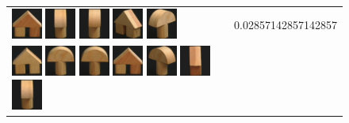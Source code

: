 \begin{figure}[tbp]
\begin{center}
\begin{tabular}{m{11cm} | m{3cm} |}
\includegraphics[width=1cm]{coil/beeld-43.eps}
\includegraphics[width=1cm]{coil/beeld-2.eps}
\includegraphics[width=1cm]{coil/beeld-5.eps}
\includegraphics[width=1cm]{coil/beeld-46.eps}
\includegraphics[width=1cm]{coil/beeld-3.eps}
& {\scriptsize 0.02857142857142857}
\\
\includegraphics[width=1cm]{coil/beeld-42.eps}
\includegraphics[width=1cm]{coil/beeld-0.eps}
\includegraphics[width=1cm]{coil/beeld-1.eps}
\includegraphics[width=1cm]{coil/beeld-43.eps}
\includegraphics[width=1cm]{coil/beeld-4.eps}
\includegraphics[width=1cm]{coil/beeld-44.eps}
\includegraphics[width=1cm]{coil/beeld-2.eps}

\end{tabular}
\end{center}
\end{figure}
